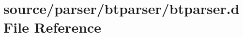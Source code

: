 \hypertarget{btparser_8d}{
\section{source/parser/btparser/btparser.d File Reference}
\label{btparser_8d}
}
